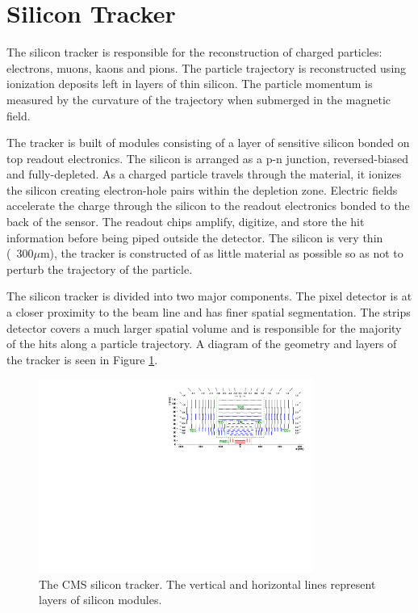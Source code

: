 \section{Silicon Tracker}

The silicon tracker is responsible for the reconstruction of charged particles: electrons, muons, kaons and pions. The particle trajectory is reconstructed using ionization deposits left in layers of thin silicon. The particle momentum is measured by the curvature of the trajectory when submerged in the magnetic field.\cite{trackertdr} \cite{trackertdradd}

The tracker is built of modules consisting of a layer of sensitive silicon bonded on top readout electronics. The silicon is arranged as a p-n junction, reversed-biased and fully-depleted. As a charged particle travels through the material, it ionizes the silicon creating electron-hole pairs within the depletion zone. Electric fields accelerate the charge through the silicon to the readout electronics bonded to the back of the sensor. The readout chips amplify, digitize, and store the hit information before being piped outside the detector. The silicon is very thin (~300$\mu$m), the tracker is constructed of as little material as possible so as not to perturb the trajectory of the particle.

The silicon tracker is divided into two major components. The pixel detector is at a closer proximity to the beam line and has finer spatial segmentation. The strips detector covers a much larger spatial volume and is responsible for the majority of the hits along a particle trajectory. A diagram of the geometry and layers of the tracker is seen in Figure \ref{fig:tracker}.

\begin{figure}[hb!]
\centering
\includegraphics[width=0.8\textwidth]{figs/TrackerLayoutNew.pdf}
\caption{The CMS silicon tracker. The vertical and horizontal lines represent layers of silicon modules.}
\label{fig:tracker}
\end{figure}

